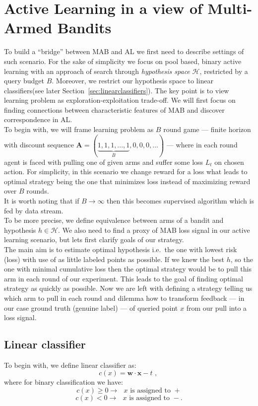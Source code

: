 \documentclass[12pt, a4paper, pdflatex, leqno]{report}
\begin{document}
\section{Active Learning in a view of Multi-Armed Bandits}
To build a ``bridge'' between MAB and AL we first need to describe settings of such scenario. For the sake of simplicity we focus on pool based, binary active learning with an approach of search through \emph{hypothesis space} $\mathscr{H}$, restricted by a query budget $B$. Moreover, we restrict our hypothesis space to linear classifiers(see later Section~\ref{sec:linearclassifiers}). The key point is to view learning problem as exploration-exploitation trade-off. We will first focus on finding connections between characteristic features of MAB and discover correspondence in AL.\\

To begin with, we will frame learning problem as $B$ round game --- finite horizon with discount sequence $\mathbf{A} = ( \underbrace{ 1, 1, 1, ..., 1}_{B}, 0, 0, 0, ... )$ --- where in each round agent is faced with pulling one of given arms and suffer some loss $L_t$ on chosen action. For simplicity, in this scenario we change reward for a loss what leads to optimal strategy being the one that minimizes loss instead of maximizing reward over $B$ rounds.\\

It is worth noting that if $B \rightarrow \infty$ then this becomes supervised algorithm which is fed by data stream.\\

To be more precise, we define equivalence between arms of a bandit and hypothesis $\mathit{h} \in \mathscr{H}$. We also need to find a proxy of MAB loss signal in our active learning scenario, but lets first clarify goals of our strategy.\\
The main aim is to estimate optimal hypothesis i.e.\ the one with lowest risk (loss) with use of as little labeled points as possible. If we knew the best $\mathit{h}$, so the one with minimal cumulative loss then the optimal strategy would be to pull this arm in each round of our experiment. This leads to the goal of finding optimal strategy as quickly as possible. Now we are left with defining a strategy telling us which arm to pull in each round and dilemma how to transform feedback --- in our case ground truth (genuine label) --- of queried point $x$ from our pull into a loss signal.\\

\subsection{Linear classifier\label{sec:linearclassifiers}}
To begin with, we define linear classifier as:
$$
c(x) = \mathbf{w} \cdot \mathbf{x} - t \text{~,~}
$$
where for binary classification we have:
$$
c(x) \geq 0 \rightarrow \text{ $x$ is assigned to $+$}
$$
$$
c(x) < 0 \rightarrow \text{ $x$ is assigned to $-$.}
$$\\
\end{document}
